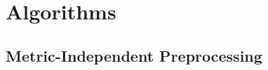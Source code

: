 \documentclass[a4paper, english, cleveref]{lipics-v2021}
\begin{document}



\section{Algorithms}
\subsection{Metric-Independent Preprocessing}
\end{document}
